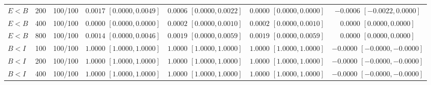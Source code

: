 \documentclass[12pt,letterpaper]{article}
\theoremstyle{plain}
\theoremstyle{definition}
\begin{document}
\begin{table}[p]
\begin{adjustbox}{max width=\linewidth}
\begin{tabular}{lrccccc}
$E<B$ & 200 & 100/100 & \shortstack{$0.0017$\\{\scriptsize$[0.0000,0.0049]$}} & \shortstack{$0.0006$\\{\scriptsize$[0.0000,0.0022]$}} & \shortstack{$0.0000$\\{\scriptsize$[0.0000,0.0000]$}} & \shortstack{$-0.0006$\\{\scriptsize$[-0.0022,0.0000]$}}\\
$E<B$ & 400 & 100/100 & \shortstack{$0.0000$\\{\scriptsize$[0.0000,0.0000]$}} & \shortstack{$0.0002$\\{\scriptsize$[0.0000,0.0010]$}} & \shortstack{$0.0002$\\{\scriptsize$[0.0000,0.0010]$}} & \shortstack{$0.0000$\\{\scriptsize$[0.0000,0.0000]$}}\\
$E<B$ & 800 & 100/100 & \shortstack{$0.0014$\\{\scriptsize$[0.0000,0.0046]$}} & \shortstack{$0.0019$\\{\scriptsize$[0.0000,0.0059]$}} & \shortstack{$0.0019$\\{\scriptsize$[0.0000,0.0059]$}} & \shortstack{$0.0000$\\{\scriptsize$[0.0000,0.0000]$}}\\
\addlinespace
$B<I$ & 100 & 100/100 & \shortstack{$1.0000$\\{\scriptsize$[1.0000,1.0000]$}} & \shortstack{$1.0000$\\{\scriptsize$[1.0000,1.0000]$}} & \shortstack{$1.0000$\\{\scriptsize$[1.0000,1.0000]$}} & \shortstack{$-0.0000$\\{\scriptsize$[-0.0000,-0.0000]$}}\\
$B<I$ & 200 & 100/100 & \shortstack{$1.0000$\\{\scriptsize$[1.0000,1.0000]$}} & \shortstack{$1.0000$\\{\scriptsize$[1.0000,1.0000]$}} & \shortstack{$1.0000$\\{\scriptsize$[1.0000,1.0000]$}} & \shortstack{$-0.0000$\\{\scriptsize$[-0.0000,-0.0000]$}}\\
$B<I$ & 400 & 100/100 & \shortstack{$1.0000$\\{\scriptsize$[1.0000,1.0000]$}} & \shortstack{$1.0000$\\{\scriptsize$[1.0000,1.0000]$}} & \shortstack{$1.0000$\\{\scriptsize$[1.0000,1.0000]$}} & \shortstack{$-0.0000$\\{\scriptsize$[-0.0000,-0.0000]$}}\\

\end{tabular}
\end{adjustbox}
\end{table}
\end{document}
